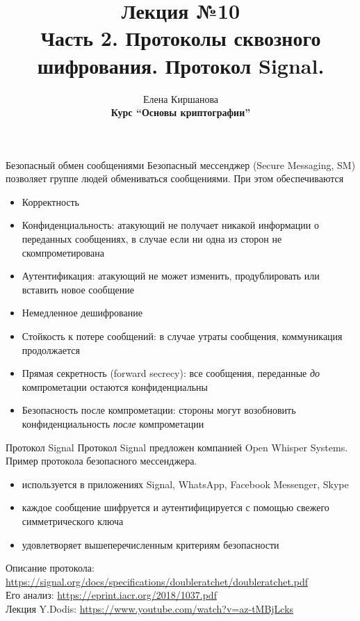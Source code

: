 \documentclass[usenames,dvipsnames,8pt,aspectratio=169]{beamer}
\title{Лекция №10 \\[10pt]
	Часть 2. Протоколы сквозного шифрования. Протокол Signal.}
\date{ Елена Киршанова \\  \textbf{Курс ``Основы криптографии''} \\  }
\begin{document}
	
\begin{frame}
	\titlepage
\end{frame}



\begin{frame}{Безопасный обмен сообщениями}
	\Large
	{\color{Orange} Безопасный мессенджер (Secure Messaging, SM)} позволяет группе людей обмениваться сообщениями. При этом обеспечиваются\\[10pt]
	\large

	\begin{itemize}
		\itemsep5pt
		\item {\color{Orange} Корректность}
		\item {\color{Orange} Конфиденциальность:} атакующий не получает никакой информации о переданных сообщениях, в случае если ни одна из сторон не скомпрометирована
		\item {\color{Orange} Аутентификация:} атакующий не может изменить, продублировать или вставить новое сообщение
		\item  {\color{Orange} Немедленное дешифрование}
		\item {\color{Orange}  Стойкость к потере сообщений:} в случае утраты сообщения, коммуникация продолжается
		\item {\color{Orange} Прямая секретность (forward secrecy):} все сообщения, переданные \emph{до} компрометации остаются конфиденциальны
		\item {\color{Orange} Безопасность после компрометации: } стороны могут возобновить конфиденциальность \emph{после} компрометации
	\end{itemize}
	\centering
\end{frame}

\begin{frame}{Протокол Signal}
	\Large
	{\color{Orange}Протокол Signal} предложен компанией Open Whisper Systems. Пример протокола безопасного мессенджера. \\[10pt]
	\large
	\begin{itemize}
		\itemsep 7pt
		\item используется в приложениях Signal, WhatsApp, Facebook Messenger, Skype
		\item каждое сообщение шифруется и аутентифицируется с помощью свежего симметрического ключа
		\item удовлетворяет вышеперечисленным критериям безопасности 
	\end{itemize}
	\vspace{30pt}

\normalsize 
Описание протокола: \\ \url{https://signal.org/docs/specifications/doubleratchet/doubleratchet.pdf} \\[5pt]
Его анализ: \url{https://eprint.iacr.org/2018/1037.pdf} \\[5pt]
Лекция Y.Dodis: \url{https://www.youtube.com/watch?v=az-tMBjLcks}

\end{frame}
\end{document}
